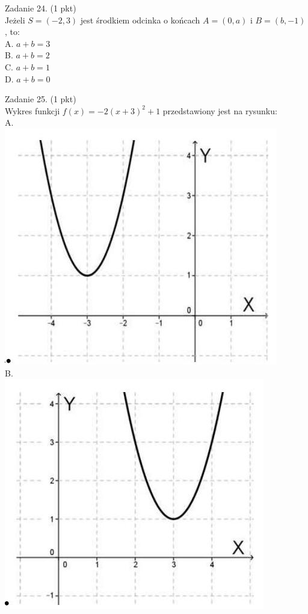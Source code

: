 \documentclass[10pt]{article}
\begin{document}
Zadanie 24. (1 pkt)\\
Jeżeli \(S=(-2,3)\) jest środkiem odcinka o końcach \(A=(0, a)\) i \(B=(b,-1)\), to:\\
A. \(a+b=3\)\\
B. \(a+b=2\)\\
C. \(a+b=1\)\\
D. \(a+b=0\)

Zadanie 25. (1 pkt)\\
Wykres funkcji \(f(x)=-2(x+3)^{2}+1\) przedstawiony jest na rysunku:\\
A.\\
\includegraphics[max width=\textwidth, center]{2024_11_21_b31e6de468170710de69g-08}\\
B.\\
\includegraphics[max width=\textwidth, center]{2024_11_21_b31e6de468170710de69g-08(4)}\\
\end{document}
